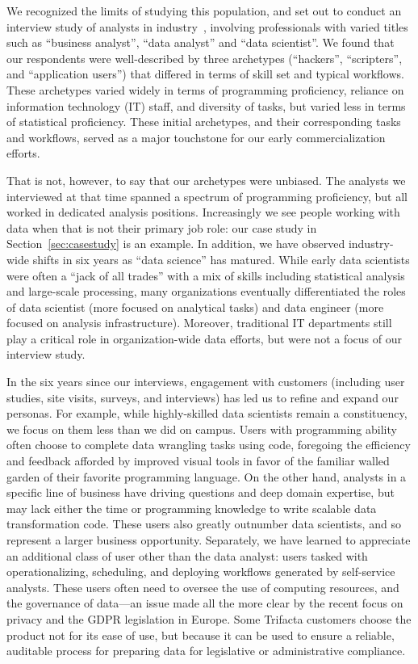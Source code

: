 \documentclass[11pt]{article}
\begin{document}
We recognized the limits of studying this population, and
set out
to conduct an interview study of analysts in industry~\cite{interviews}, involving professionals with varied titles such as ``business analyst'', ``data analyst'' and ``data scientist''. We found that our respondents were well-described by three archetypes (``hackers'', ``scripters'', and ``application users'') that differed in terms of skill set and typical workflows. These archetypes varied widely in terms of programming proficiency, reliance on information technology (IT) staff, and diversity of tasks, but varied less in terms of statistical proficiency. These initial archetypes, and their corresponding tasks and workflows, served as a major touchstone for our early commercialization efforts.

That is not, however, to say that our archetypes were unbiased. The analysts we interviewed at that time spanned a spectrum of programming proficiency, but all worked in dedicated analysis positions.  
Increasingly we see people working with data when that is not their primary job role: our case study in Section~\ref{sec:casestudy} is an example. In addition, we have observed industry-wide shifts in six years as ``data science'' has matured. While early data scientists were often a ``jack of all trades'' with a mix of skills including statistical analysis and large-scale processing, many organizations eventually differentiated the roles of data scientist (more focused on analytical tasks) and data engineer (more focused on analysis infrastructure). Moreover, traditional IT departments still play a critical role in organization-wide data efforts, but were not a focus of our interview study.

In the six years since our interviews, engagement with customers (including user studies, site visits, surveys, and interviews) has led us to refine and expand our personas. 
For example, while highly-skilled data scientists remain a constituency, we focus on them less than we did on campus. Users with programming ability often choose to complete data wrangling tasks using code, foregoing the efficiency and feedback afforded by improved visual tools in favor of the familiar walled garden of their favorite programming language. 
On the other hand, analysts in a specific line of business have driving questions and deep domain expertise, but may lack either the time or programming knowledge to write scalable data transformation code. These users also greatly outnumber data scientists, and so represent a larger business opportunity. 
Separately, we have learned to appreciate an additional class of user other than the data analyst:
users tasked with operationalizing, scheduling, and deploying workflows generated by self-service analysts. These users often need to oversee the use of computing resources, and the governance of data---an issue made all the more clear by the recent focus on privacy and the GDPR legislation in Europe. Some Trifacta customers choose the product not for its ease of use, but because it can be used to ensure a reliable, auditable process for preparing data for legislative or administrative compliance. 
\end{document}
